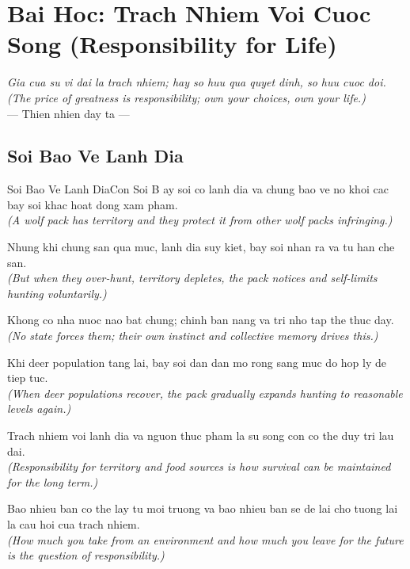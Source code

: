 \chapter{Bai Hoc: Trach Nhiem Voi Cuoc Song (Responsibility for Life)}
\begin{center}
  \textit{\color{truyenblue}Gia cua su vi dai la trach nhiem; hay so huu qua quyet dinh, so huu cuoc doi.}\\
  \textit{(The price of greatness is responsibility; own your choices, own your life.)}\\[4pt]
  \small\color{truyengold}--- Thien nhien day ta ---
\end{center}
\ngancach

\section{Soi Bao Ve Lanh Dia}
\begin{truyen}{Soi Bao Ve Lanh Dia}{Con Soi}
B ay soi co lanh dia va chung bao ve no khoi cac bay soi khac hoat dong xam pham.\\
\textit{(A wolf pack has territory and they protect it from other wolf packs infringing.)}

Nhung khi chung san qua muc, lanh dia suy kiet, bay soi nhan ra va tu han che san.\\
\textit{(But when they over-hunt, territory depletes, the pack notices and self-limits hunting voluntarily.)}

Khong co nha nuoc nao bat chung; chinh ban nang va tri nho tap the thuc day.\\
\textit{(No state forces them; their own instinct and collective memory drives this.)}

Khi deer population tang lai, bay soi dan dan mo rong sang muc do hop ly de tiep tuc.\\
\textit{(When deer populations recover, the pack gradually expands hunting to reasonable levels again.)}

Trach nhiem voi lanh dia va nguon thuc pham la su song con co the duy tri lau dai.\\
\textit{(Responsibility for territory and food sources is how survival can be maintained for the long term.)}

\end{truyen}
\begin{baihoc}
  Bao nhieu ban co the lay tu moi truong va bao nhieu ban se de lai cho tuong lai la cau hoi cua trach nhiem.\\
  \textit{(How much you take from an environment and how much you leave for the future is the question of responsibility.)}
\end{baihoc}

